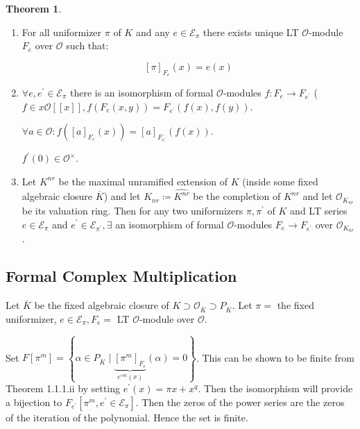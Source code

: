 \documentclass{article}
\theoremstyle{definition}
\newtheorem{theorem}{Theorem}
\numberwithin{theorem}{subsection}
\begin{document}
    \begin{theorem}
        \begin{enumerate}[label=\roman*)]
            \item For all uniformizer \(\pi\) of \(K\) and any \(e \in \mathscr{E}_{\pi}\) there exists unique LT \(\mathcal{O}\)-module \(F_e\) over \(\mathcal{O}\) such that:
            
            \[
                [\pi]_{F_e}(x) = e(x)
            \]

            \item \(\forall e, e^{\prime} \in \mathscr{E}_{\pi}\) there is an isomorphism of formal \(\mathcal{O}\)-modules \(f: F_e \to F_{e^{\prime}}\) (\(f\in x \mathcal{O} [[x]], f(F_e(x,y))=F_{e^{\prime}}(f(x),f(y))\).
            
            \(\forall a\in \mathcal{O}: f([a]_{F_e}(x))=[a]_{F_{e^{\prime}}}(f(x))\).

            \(f^{\prime} (0)\in \mathcal{O}^\times\).
            
            \item Let \(K^{nr}\) be the maximal unramified extension of \(K\) (inside some fixed algebraic closure \(\overline{K}\)) and let \(K_{nr} \coloneqq \widehat{K^{nr}}\) be the completion of \(K^{nr}\) and let \(\mathcal{O}_{K_{nr}}\) be its valuation ring. Then for any two uniformizers \(\pi , \pi ^{\prime} \) of \(K\) and LT series \(e\in \mathscr{E}_{\pi}\) and \(e^{\prime} \in \mathscr{E}_{\pi^{\prime}}, \exists\) an isomorphism of formal \(\mathcal{O}\)-modules \(F_e \to F_{e^{\prime}}\) over \(\mathcal{O}_{K_{nr}}\).  
        \end{enumerate} 
    \end{theorem}

    \subsection*{Formal Complex Multiplication}

    Let \(\overline{K}\) be the fixed algebraic closure of \(K \supset \mathcal{O}_{\overline{K}} \supset P_{\overline{K}}\). Let \(\pi =\) the fixed uniformizer, \(e\in \mathscr{E}_{\pi}, F_e =\) LT \(\mathcal{O}\)-module over \(\mathcal{O}\).
    
    Set \(F[\pi^m] = \left\{ \alpha \in P_{\overline{K}} \mid \underbrace{[\pi^m]_{F_e}}_{e^{\circ m}(x)}(\alpha) = 0 \right\} \). This can be shown to be finite from Theorem 1.1.1.ii by setting \(e^{\prime}(x) = \pi x + x^q\). Then the isomorphism will provide a bijection to \(F_{e^{\prime}}[\pi^{m}, e^{\prime} \in \mathscr{E}_{\pi}]\). Then the zeros of the power series are the zeros of the iteration of the polynomial. Hence the set is finite.
\end{document}

